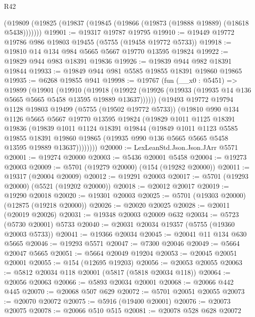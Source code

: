 \begin{lexlean}{R42}
\begin{coremodule}
    (@19809 (@19825 (@19837 (@19845 (@19866 (@19873 (@19888 @19889) (@18618 @5438)))))))
@19901 := @19317 @19787 @19795
@19910 := @19449 @19772 @19786 @986 @19803 @19455 (@5755 (@19458 @19772 @5733))
@19918 := @19810 @14 @134 @984 @5665 @5667 @19770 @13595 @19824
@19922 := @19829 @944 @983 @18391 @19836
@19926 := @19839 @944 @982 @18391 @19844
@19933 := @19849 @944 @981 @5585 @19855 @18391 @19860 @19865
@19935 := @6268 @19855 @941
@19998 := @19767
    (fun (__x0 : @5451) =>
    @19899
      (@19901
        (@19910
          (@19918
            (@19922 (@19926 (@19933 (@19935 @14 @136 @5665 @5665 @5458 @13595 @19889 @13637))))))
        (@19493
          @19772
          @19794
          @1128
          @19803
          @19499
          (@5755 (@19502 @19772 @5733))
          (@19810
            @990
            @134
            @1126
            @5665
            @5667
            @19770
            @13595
            @19824
            (@19829
              @1011
              @1125
              @18391
              @19836
              (@19839
                @1011
                @1124
                @18391
                @19844
                (@19849
                  @1011
                  @1123
                  @5585
                  @19855
                  @18391
                  @19860
                  @19865
                  (@19935 @990 @136 @5665 @5665 @5458 @13595 @19889 @13637))))))))
@20000 := LexLeanStd.Json.Json.JArr @5571
@20001 := @19274 @20000
@20003 := @5436 @20001 @5458
@20004 := @19273 @20003
@20009 := @5701 (@19279 @20000) (@154 (@19282 @20000))
@20011 := @19317 (@20004 @20009)
@20012 := @19291 @20003
@20017 := @5701 (@19293 @20000) (@5521 (@19202 @20000))
@20018 := @20012 @20017
@20019 := @19290 @20018
@20020 := @19301 @20003
@20025 := @5701 (@19303 @20000) (@12875 (@19218 @20000))
@20026 := @20020 @20025
@20028 := @20011 (@20019 @20026)
@20031 := @19348 @20003 @20009 @632
@20034 := @5723 (@5730 @20001) @5733
@20040 := @20031 @20034 @19357 (@5755 (@19360 @20003 @5733))
@20041 := @19366 @20034
@20045 := @20041 @11 @134 @630 @5665
@20046 := @19293 @5571
@20047 := @7300 @20046
@20049 := @5664 @20047 @5665
@20051 := @5664 @20049 @19204
@20053 := @20045 @20051 @20001
@20055 := @154 (@12695 @19203)
@20056 := @20053 @20055
@20063 := @5812 @20034 @118 @20001 (@5817 (@5818 @20034 @118))
@20064 := @20056 @20063
@20066 := @5893 @20034 @20001
@20068 := @20066 @442 @445
@20070 := @20068 @507 @629
@20072 := @5701 @20051 @20055
@20073 := @20070 @20072
@20075 := @5916 (@19400 @20001)
@20076 := @20073 @20075
@20078 := @20066 @510 @515
@20081 := @20078 @528 @628 @20072

\end{coremodule}
\end{lexlean}
